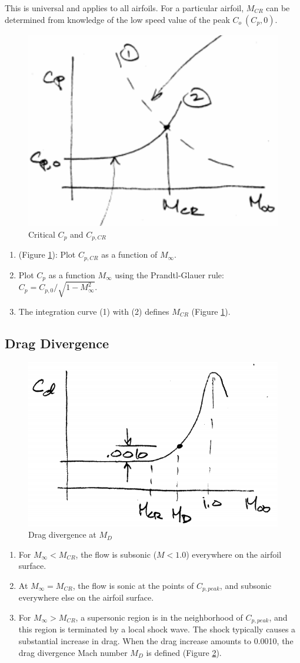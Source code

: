 \documentclass[draft=false, titlepage]{article}
\begin{document}
This is universal and applies to all airfoils. For a particular airfoil, $M_{CR}$ can be determined from knowledge of the low speed value of the peak $C_o\ (C_p,0)$.
\begin{figure}[ht]
	\centering
	\includegraphics[width=0.4\linewidth]{Figures/p50_CpCritical.PNG}
	\caption{Critical $C_p$ and $C_{p,CR}$}
	\label{fig:p50_CpCritical}
\end{figure}
\begin{enumerate}
	\item (Figure \ref{fig:p50_CpCritical}): Plot $C_{p,CR}$ as a function of $M_\infty$.
	\item Plot $C_p$ as a function $M_\infty$ using the Prandtl-Glauer rule: $C_p = C_{p,0}/\sqrt{1-M_\infty^2}$.
	\item The integration curve (1) with (2) defines $M_{CR}$ (Figure \ref{fig:p50_CpCritical}).
\end{enumerate}

\subsection{Drag Divergence}
\begin{figure}[ht]
	\centering
	\includegraphics[width=0.5\linewidth]{Figures/p51_dragDivergence.PNG}
	\caption{Drag divergence at $M_D$}
	\label{fig:p51_dragDivergence}
\end{figure}
\begin{enumerate}
	\item For $M_\infty<M_{CR}$, the flow is subsonic ($M<1.0$) everywhere on the airfoil surface.
	\item At $M_\infty = M_{CR}$, the flow is sonic at the points of $C_{p,peak}$, and subsonic everywhere else on the airfoil surface.
	\item For $M_\infty > M_{CR}$, a supersonic region is in the neighborhood of $C_{p, peak}$, and this region is terminated by a local shock wave. The shock typically causes a substantial increase in drag. When the drag increase amounts to 0.0010, the drag divergence Mach number $M_D$ is defined (Figure \ref{fig:p51_dragDivergence}).
\end{enumerate}
\end{document}
